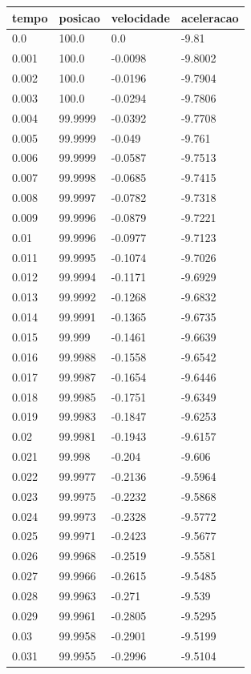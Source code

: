 \begin{tabular}{llll}
\toprule
tempo & posicao & velocidade & aceleracao \\
\midrule
0.0 & 100.0 & 0.0 & -9.81 \\
0.001 & 100.0 & -0.0098 & -9.8002 \\
0.002 & 100.0 & -0.0196 & -9.7904 \\
0.003 & 100.0 & -0.0294 & -9.7806 \\
0.004 & 99.9999 & -0.0392 & -9.7708 \\
0.005 & 99.9999 & -0.049 & -9.761 \\
0.006 & 99.9999 & -0.0587 & -9.7513 \\
0.007 & 99.9998 & -0.0685 & -9.7415 \\
0.008 & 99.9997 & -0.0782 & -9.7318 \\
0.009 & 99.9996 & -0.0879 & -9.7221 \\
0.01 & 99.9996 & -0.0977 & -9.7123 \\
0.011 & 99.9995 & -0.1074 & -9.7026 \\
0.012 & 99.9994 & -0.1171 & -9.6929 \\
0.013 & 99.9992 & -0.1268 & -9.6832 \\
0.014 & 99.9991 & -0.1365 & -9.6735 \\
0.015 & 99.999 & -0.1461 & -9.6639 \\
0.016 & 99.9988 & -0.1558 & -9.6542 \\
0.017 & 99.9987 & -0.1654 & -9.6446 \\
0.018 & 99.9985 & -0.1751 & -9.6349 \\
0.019 & 99.9983 & -0.1847 & -9.6253 \\
0.02 & 99.9981 & -0.1943 & -9.6157 \\
0.021 & 99.998 & -0.204 & -9.606 \\
0.022 & 99.9977 & -0.2136 & -9.5964 \\
0.023 & 99.9975 & -0.2232 & -9.5868 \\
0.024 & 99.9973 & -0.2328 & -9.5772 \\
0.025 & 99.9971 & -0.2423 & -9.5677 \\
0.026 & 99.9968 & -0.2519 & -9.5581 \\
0.027 & 99.9966 & -0.2615 & -9.5485 \\
0.028 & 99.9963 & -0.271 & -9.539 \\
0.029 & 99.9961 & -0.2805 & -9.5295 \\
0.03 & 99.9958 & -0.2901 & -9.5199 \\
0.031 & 99.9955 & -0.2996 & -9.5104 \\

\end{tabular}
